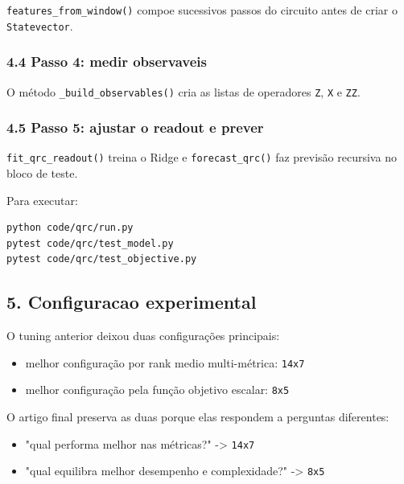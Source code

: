 \documentclass[12pt]{article}
\providecommand{\tightlist}{%
          \setlength{\itemsep}{0pt}\setlength{\parskip}{0pt}}
\begin{document}
\texttt{features\_from\_window()} compoe sucessivos passos do circuito antes de criar o \texttt{Statevector}.

\subsubsection{4.4 Passo 4: medir observaveis}\label{44-passo-4-medir-observaveis}

O método \texttt{\_build\_observables()} cria as listas de operadores \texttt{Z}, \texttt{X} e \texttt{ZZ}.

\subsubsection{4.5 Passo 5: ajustar o readout e prever}\label{45-passo-5-ajustar-o-readout-e-prever}

\texttt{fit\_qrc\_readout()} treina o Ridge e \texttt{forecast\_qrc()} faz previsão recursiva no bloco de teste.

Para executar:

\begin{verbatim}
python code/qrc/run.py
pytest code/qrc/test_model.py
pytest code/qrc/test_objective.py
\end{verbatim}

\subsection{5. Configuracao experimental}\label{5-configuracao-experimental}

O tuning anterior deixou duas configurações principais:

\begin{itemize}
\tightlist
\item
  melhor configuração por rank medio multi-métrica: \texttt{14x7}
\item
  melhor configuração pela função objetivo escalar: \texttt{8x5}
\end{itemize}

O artigo final preserva as duas porque elas respondem a perguntas diferentes:

\begin{itemize}
\tightlist
\item
  "qual performa melhor nas métricas?" -\textgreater{} \texttt{14x7}
\item
  "qual equilibra melhor desempenho e complexidade?" -\textgreater{} \texttt{8x5}
\end{itemize}
\end{document}
